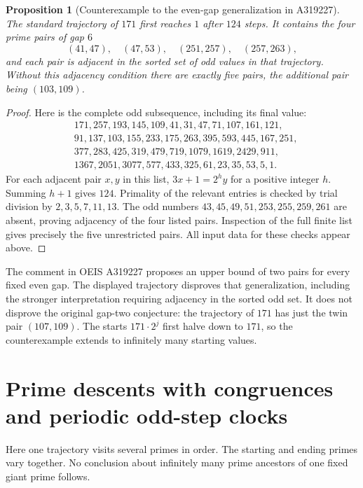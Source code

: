 \documentclass[11pt,a4paper]{article}
\newtheorem{proposition}[theorem]{Proposition}
\theoremstyle{definition}
\theoremstyle{remark}
\numberwithin{equation}{section}
\begin{document}
\begin{proposition}[Counterexample to the even-gap generalization in A319227]
The standard trajectory of $171$ first reaches $1$ after $124$ steps.
It contains the four prime pairs of gap $6$
\[
 (41,47),\quad(47,53),\quad(251,257),\quad(257,263),
\]
and each pair is adjacent in the sorted set of odd values in that
trajectory. Without this adjacency condition there are exactly five
pairs, the additional pair being $(103,109)$.
\end{proposition}
\begin{proof}
Here is the complete odd subsequence, including its final value:
\begin{align*}
&171,257,193,145,109,41,31,47,71,107,161,121,\\
&91,137,103,155,233,175,263,395,593,445,167,251,\\
&377,283,425,319,479,719,1079,1619,2429,911,\\
&1367,2051,3077,577,433,325,61,23,35,53,5,1.
\end{align*}
For each adjacent pair $x,y$ in this list, $3x+1=2^h y$ for a positive
integer $h$. Summing $h+1$ gives $124$. Primality of the relevant entries
is checked by trial division by $2,3,5,7,11,13$. The odd numbers
$43,45,49,51,253,255,259,261$ are absent, proving adjacency of the four
listed pairs. Inspection of the full finite list gives precisely the
five unrestricted pairs. All input data for these checks appear above.
\end{proof}
The comment in OEIS A319227 \cite{R009} proposes an upper bound of
two pairs for every fixed even gap. The displayed trajectory disproves
that generalization, including the stronger interpretation requiring
adjacency in the sorted odd set. It does not disprove the original
gap-two conjecture: the trajectory of $171$ has just the twin pair
$(107,109)$. The starts $171\cdot2^j$ first halve down to $171$, so the
counterexample extends to infinitely many starting values.

\section{Prime descents with congruences and periodic odd-step clocks}
\label{A:sec:audited-prime-chain}
Here one trajectory visits several primes in order. The starting and
ending primes vary together. No conclusion about infinitely many prime
ancestors of one fixed giant prime follows.
\end{document}
